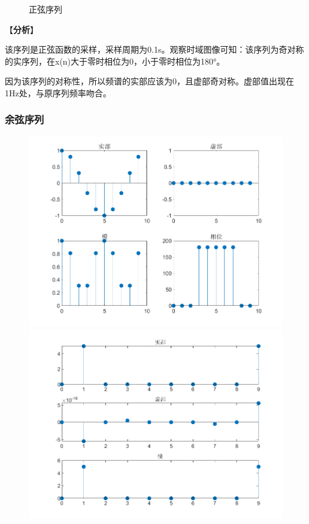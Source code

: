 \documentclass{../source/zjureport}
\begin{document}
\begin{figure}[H]
\begin{minipage}[t]{0.48\textwidth}
                    \end{minipage}
                    \caption{正弦序列}
                \end{figure}

                【\textbf{分析}】

                该序列是正弦函数的采样，采样周期为0.1s。观察时域图像可知：该序列为奇对称的实序列，在x(n)大于零时相位为0，小于零时相位为180°。

                因为该序列的对称性，所以频谱的实部应该为0，且虚部奇对称。虚部值出现在1Hz处，与原序列频率吻合。
                

            \subsubsection{余弦序列}
                \begin{figure}[H]
                    \centering
                    \begin{minipage}[t]{0.48\textwidth}
                    \centering
                    \includegraphics[width=\textwidth]{figure/余弦序列.png}
                    \end{minipage}
                    \begin{minipage}[t]{0.48\textwidth}
                    \centering
                    \includegraphics[width=\textwidth]{figure/频谱_余弦序列.png}

\end{minipage}
\end{figure}
\end{document}
